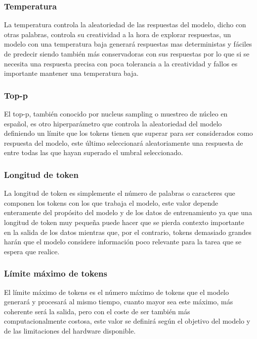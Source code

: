 \subsubsection{Temperatura}

La temperatura controla la aleatoriedad de las respuestas del modelo, dicho con otras palabras, controla su creatividad a la hora de explorar respuestas, un modelo con una temperatura baja generará respuestas mas deterministas y fáciles de predecir siendo también más conservadoras con sus respuestas por lo que si se necesita una respuesta precisa con poca tolerancia a la creatividad y fallos es importante mantener una temperatura baja.

\subsubsection{Top-p}

El top-p, también conocido por nucleus sampling o muestreo de núcleo en español, es otro hiperparámetro que controla la aleatoriedad del modelo definiendo un límite que los tokens tienen que superar para ser considerados como respuesta del modelo, este último seleccionará aleatoriamente una respuesta de entre todas las que hayan superado el umbral seleccionado. 

\subsubsection{Longitud de token}

La longitud de token es simplemente el número de palabras o caracteres que componen los tokens con los que trabaja el modelo, este valor depende enteramente del propósito del modelo y de los datos de entrenamiento ya que una longitud de token muy pequeña puede hacer que se pierda contexto importante en la salida de los datos mientras que, por el contrario, tokens demasiado grandes harán que el modelo considere información poco relevante para la tarea que se espera que realice.

\subsubsection{Límite máximo de tokens}

El límite máximo de tokens es el número máximo de tokens que el modelo generará y procesará al mismo tiempo, cuanto mayor sea este máximo, más coherente será la salida, pero con el coste de ser también más computacionalmente costosa, este valor se definirá según el objetivo del modelo y de las limitaciones del hardware disponible.

